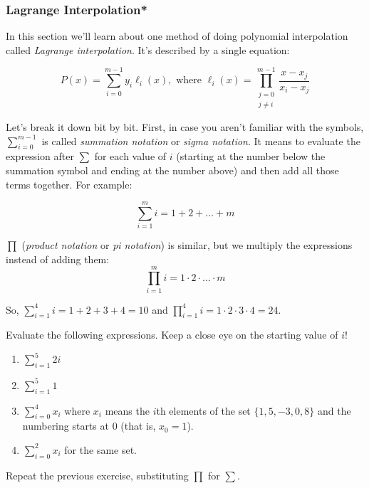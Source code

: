 \subsubsection{Lagrange Interpolation*}\label{sec:lagrange}

In this section we'll learn about one method of doing polynomial interpolation 
called \emph{Lagrange interpolation}. It's described by a single equation:

\begin{equation}\label{eqn:lagrange}
    P(x) = \sum_{i=0}^{m-1} y_i \ell_i(x), \text{ where } 
    \ell_i(x) = \prod_{\substack{j=0\\j\neq i}}^{m-1} \frac{x-x_j}{x_i-x_j}
\end{equation}

Let's break it down bit by bit. First, in case you aren't familiar with 
the symbols, $\sum_{i=0}^{m-1}$ is called \emph{summation notation} 
or \emph{sigma notation}. It means to evaluate the expression after 
$\sum$ for each value of $i$ (starting at the number below the summation 
symbol and ending at the number above) and then add all those terms together. For 
example:

\[
    \sum_{i=1}^m i = 1 + 2 + \ldots + m
\]

$\prod$ (\emph{product notation} or \emph{pi notation}) is similar, but we multiply the expressions instead of adding 
them:
\[
    \prod_{i=1}^m i = 1 \cdot 2 \cdot \ldots \cdot m
\]

So, $\sum_{i=1}^{4} i = 1+2+3+4 = 10$ and $\prod_{i=1}^4 i = 1 \cdot 2 \cdot 3 
\cdot 4 = 24$.

\begin{bonus}
    Evaluate the following expressions. Keep a close eye on the starting 
    value of $i$!
    \renewcommand{\labelenumi}{(\alph{enumi})} 
    \begin{enumerate}
        \item $\sum_{i=1}^5 2i$
        \item $\sum_{i=1}^5 1$
        \item $\sum_{i=0}^4 x_i$ where $x_i$ means the $i$th 
        elements of the set $\{1, 5, -3, 0, 8\}$ and the numbering
        starts at 0 (that is, $x_0=1$).
        \item $\sum_{i=0}^2 x_i$ for the same set.
    \end{enumerate}
\end{bonus}

\begin{bonus}
    Repeat the previous exercise, substituting $\prod$ for $\sum$.
\end{bonus}


